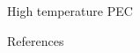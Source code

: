 \documentclass[10pt,compress,handout]{beamer}
\begin{document}
\begin{frame}[allowframebreaks=1.0]{High temperature PEC}
\begin{figure}[h]
            \label{fig_skocic_phd}
        \end{figure}
    \end{frame}




\begin{frame}[allowframebreaks=0.9]{References}
\AtNextBibliography{\tiny}
\printbibliography
\end{frame}
\end{document}
